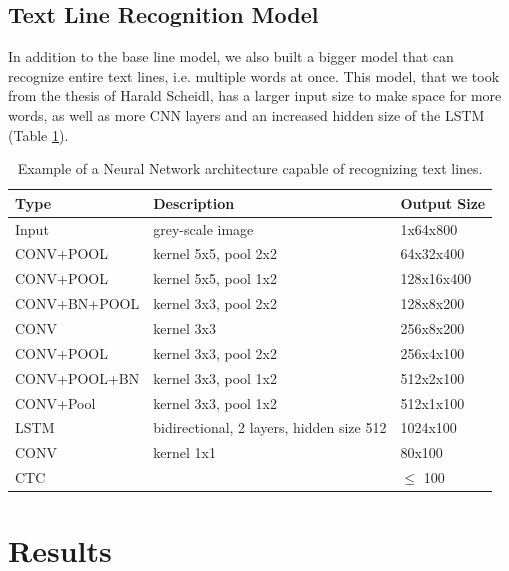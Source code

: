 \documentclass{article}
\begin{document}
\subsection{Text Line Recognition Model}
In addition to the base line model, we also built a bigger model that can recognize entire text lines, i.e. multiple words at once. This model, that we took from the thesis of Harald Scheidl\cite{ScheidlThesis}, has a larger input size to make space for more words, as well as more CNN layers and an increased hidden size of the LSTM (Table \ref{tab:BigModel}).
\begin{table}[H]
\centering
\begin{tabular}{l|l|l}
Type & Description & Output Size \\ \hline
Input & grey-scale image & 1x64x800 \\ \hline
CONV+POOL & kernel 5x5, pool 2x2 & 64x32x400 \\ \hline
CONV+POOL & kernel 5x5, pool 1x2 & 128x16x400 \\ \hline
CONV+BN+POOL & kernel 3x3, pool 2x2 & 128x8x200 \\ \hline
CONV & kernel 3x3 & 256x8x200 \\ \hline
CONV+POOL & kernel 3x3, pool 2x2 & 256x4x100 \\ \hline
CONV+POOL+BN & kernel 3x3, pool 1x2 & 512x2x100 \\ \hline
CONV+Pool & kernel 3x3, pool 1x2 & 512x1x100 \\ \hline
LSTM         & bidirectional, 2 layers, hidden size 512 & 1024x100 \\ \hline
CONV         & kernel 1x1 & 80x100 \\ \hline
CTC          &      & \(\leqslant\) 100 \\ \hline
\end{tabular}
\caption{Example of a Neural Network architecture capable of recognizing text lines.}
\label{tab:BigModel}
\end{table}

\newpage
\section{Results}
\end{document}
